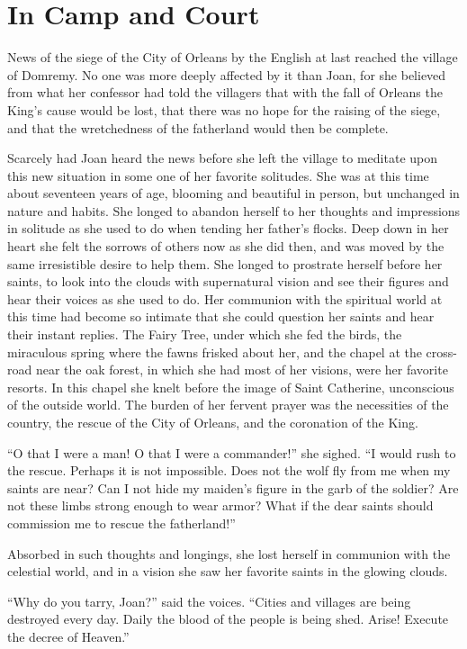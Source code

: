 \chapter{In Camp and Court}

\drop News of the siege of the City of Orleans by the English at last
reached the village of Domremy. No one was more deeply affected by it
than Joan, for she believed from what her confessor had told the
villagers that with the fall of Orleans the King's cause would be lost,
that there was no hope for the raising of the siege, and that the
wretchedness of the fatherland would then be complete.

Scarcely had Joan heard the news before she left the village to meditate
upon this new situation in some one of her favorite solitudes. She was
at this time about seventeen years of age, blooming and beautiful in
person, but unchanged in nature and habits. She longed to abandon
herself to her thoughts and impressions in solitude as she used to do
when tending her father's flocks. Deep down in her heart she felt the
sorrows of others now as she did then, and was moved by the same
irresistible desire to help them. She longed to prostrate herself before
her saints, to look into the clouds with supernatural vision and see
their figures and hear their voices as she used to do. Her communion
with the spiritual world at this time had become so intimate that she
could question her saints and hear their instant replies. The Fairy
Tree, under which she fed the birds, the miraculous spring where the
fawns frisked about her, and the chapel at the cross-road near the oak
forest, in which she had most of her visions, were her favorite resorts.
In this chapel she knelt before the image of Saint Catherine,
unconscious of the outside world. The burden of her fervent prayer was
the necessities of the country, the rescue of the City of Orleans, and
the coronation of the King.

``O that I were a man! O that I were a commander!'' she sighed. ``I
would rush to the rescue. Perhaps it is not impossible. Does not the
wolf fly from me when my saints are near? Can I not hide my maiden's
figure in the garb of the soldier? Are not these limbs strong enough to
wear armor? What if the dear saints should commission me to rescue the
fatherland!''

Absorbed in such thoughts and longings, she lost herself in communion
with the celestial world, and in a vision she saw her favorite saints in
the glowing clouds.

``Why do you tarry, Joan?'' said the voices. ``Cities and villages are
being destroyed every day. Daily the blood of the people is being shed.
Arise! Execute the decree of Heaven.''

